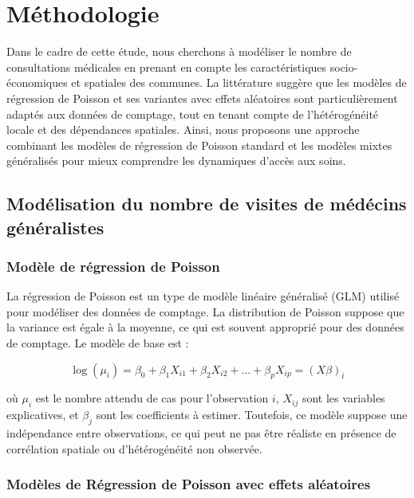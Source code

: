 \documentclass[
]{article}
\author{}
\date{\vspace{-2.5em}}
\begin{document}
\section{Méthodologie}\label{muxe9thodologie}

Dans le cadre de cette étude, nous cherchons à modéliser le nombre de
consultations médicales en prenant en compte les caractéristiques
socio-économiques et spatiales des communes. La littérature suggère que
les modèles de régression de Poisson et ses variantes avec effets
aléatoires sont particulièrement adaptés aux données de comptage, tout
en tenant compte de l'hétérogénéité locale et des dépendances spatiales.
Ainsi, nous proposons une approche combinant les modèles de régression
de Poisson standard et les modèles mixtes généralisés pour mieux
comprendre les dynamiques d'accès aux soins.

\subsection{Modélisation du nombre de visites de médécins
généralistes}\label{moduxe9lisation-du-nombre-de-visites-de-muxe9duxe9cins-guxe9nuxe9ralistes}

\subsubsection{Modèle de régression de
Poisson}\label{moduxe8le-de-ruxe9gression-de-poisson}

La régression de Poisson est un type de modèle linéaire généralisé (GLM)
utilisé pour modéliser des données de comptage. La distribution de
Poisson suppose que la variance est égale à la moyenne, ce qui est
souvent approprié pour des données de comptage. Le modèle de base est :

\[
\log(\mu_i) = \beta_0 + \beta_1 X_{i1} + \beta_2 X_{i2} + \dots + \beta_p X_{ip} = (X\beta)_i
\]

où \(\mu_i\) est le nombre attendu de cas pour l'observation \(i\),
\(X_{ij}\) sont les variables explicatives, et \(\beta_j\) sont les
coefficients à estimer. Toutefois, ce modèle suppose une indépendance
entre observations, ce qui peut ne pas être réaliste en présence de
corrélation spatiale ou d'hétérogénéité non observée.

\subsubsection{Modèles de Régression de Poisson avec effets
aléatoires}\label{moduxe8les-de-ruxe9gression-de-poisson-avec-effets-aluxe9atoires}
\end{document}
